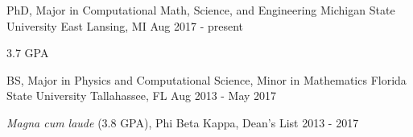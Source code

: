 

\begin{cventries}

  \cventry
  {PhD, Major in Computational Math, Science, and Engineering} %
  {Michigan State University} %
  {East Lansing, MI} %
  {Aug 2017 - present} %
  {
    \begin{cvitems} %
      \item {3.7 GPA}
    \end{cvitems}
  }

  \cventry
  {BS, Major in Physics and Computational Science, Minor in Mathematics} %
  {Florida State University} %
  {Tallahassee, FL} %
  {Aug 2013 - May 2017} %
  {
    \begin{cvitems} %
      \item {\textit{Magna cum laude} (3.8 GPA), Phi Beta Kappa, Dean's List 2013 - 2017}
    \end{cvitems}
  }
\end{cventries}
